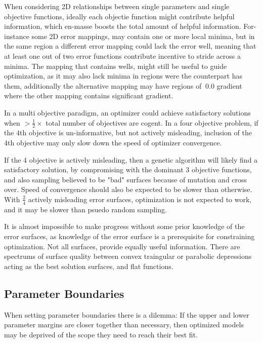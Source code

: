      
   When considering 2D relationships between single parameters and single objective functions, ideally each objectie function might contribute helpful information, which en-masse boosts the total amount of helpful information. For-instance some 2D error mappings, may contain one or more local minima, but in the same region a different error mapping could lack the error well, meaning that at least one out of two error functions contribute incentive to stride across a minima. The mapping that contains wells, might still be useful to guide optimization, as it may also lack minima in regions were the counterpart has them, additionally the alternative mapping may have regions of $~0.0$ gradient where the other mapping contains significant gradient.
   
   
   In a multi objective paradigm, an optimizer could achieve satisfactory solutions when $> \frac{1}{2} \times$ total number of objectives are cogent. In a four objective problem, if the $4$th objective is un-informative, but not actively misleading, inclusion of the 4th objective may only slow down the speed of optimizer convergence.
   
   If the $4$ objective is actively misleading, then a genetic algorithm will likely find a satisfactory solution, by compromising with the dominant $3$ objective functions, and also sampling believed to be "bad" surfaces because of mutation and cross over. Speed of convergence should also be expected to be slower than otherwise. With $\frac{2}{4}$ actively misleading error surfaces, optimization is not expected to work, and it may be slower than psuedo random sampling.
   
   
   It is almost impossible to make progress without some prior knowledge of the error surfaces, as knowledge of the error surface is a prerequisite for constraining optimization. Not all surfaces, provide equally useful information. There are spectrums of surface quality between convex traingular or parabolic depressions acting as the best solution surfaces, and flat functions. 
   

\subsection{Parameter Boundaries}
When setting parameter boundaries there is a dilemma: If the upper and lower parameter margins are closer together than necessary, then optimized models may be deprived of the scope they need to reach their best fit. 

